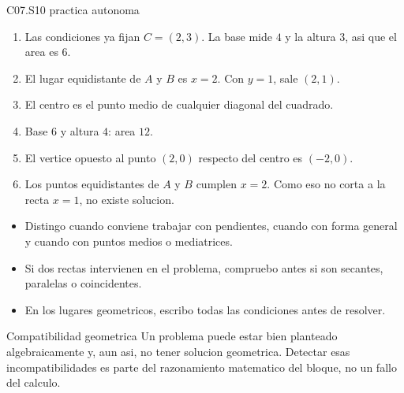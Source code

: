 \begin{fullsolution}{C07.S10 practica autonoma}
\begin{enumerate}[label=\textbf{PX-C07.S10-\arabic*:}, leftmargin=*]
  \item Las condiciones ya fijan \(C=(2,3)\). La base mide \(4\) y la altura \(3\), asi que el
  area es \(6\).
  \item El lugar equidistante de \(A\) y \(B\) es \(x=2\). Con \(y=1\), sale \((2,1)\).
  \item El centro es el punto medio de cualquier diagonal del cuadrado.
  \item Base \(6\) y altura \(4\): area \(12\).
  \item El vertice opuesto al punto \((2,0)\) respecto del centro es \((-2,0)\).
  \item Los puntos equidistantes de \(A\) y \(B\) cumplen \(x=2\). Como eso no corta a la recta
  \(x=1\), no existe solucion.
\end{enumerate}
\end{fullsolution}

\begin{selfcheck}
\begin{itemize}
  \item Distingo cuando conviene trabajar con pendientes, cuando con forma general y cuando con
  puntos medios o mediatrices.
  \item Si dos rectas intervienen en el problema, compruebo antes si son secantes, paralelas o
  coincidentes.
  \item En los lugares geometricos, escribo todas las condiciones antes de resolver.
\end{itemize}
\end{selfcheck}

\begin{extension}{Compatibilidad geometrica}
Un problema puede estar bien planteado algebraicamente y, aun asi, no tener solucion
geometrica. Detectar esas incompatibilidades es parte del razonamiento matematico del bloque,
no un fallo del calculo.
\end{extension}
